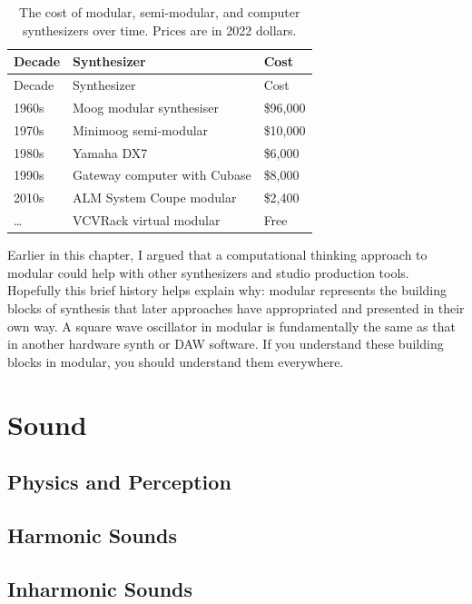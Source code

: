 \documentclass[
]{book}
\begin{document}
\begin{longtable}[]{@{}lll@{}}
\caption{\label{tab:price} The cost of modular, semi-modular, and computer synthesizers over time. Prices are in 2022 dollars.}\tabularnewline
\toprule()
Decade & Synthesizer & Cost \\
\midrule()
\endfirsthead
\toprule()
Decade & Synthesizer & Cost \\
\midrule()
\endhead
1960s & Moog modular synthesiser & \$96,000 \\
1970s & Minimoog semi-modular & \$10,000 \\
1980s & Yamaha DX7 & \$6,000 \\
1990s & Gateway computer with Cubase & \$8,000 \\
2010s & ALM System Coupe modular & \$2,400 \\
\ldots{} & VCVRack virtual modular & Free \\
\bottomrule()
\end{longtable}

Earlier in this chapter, I argued that a computational thinking approach to modular could help with other synthesizers and studio production tools.
Hopefully this brief history helps explain why: modular represents the building blocks of synthesis that later approaches have appropriated and presented in their own way.
A square wave oscillator in modular is fundamentally the same as that in another hardware synth or DAW software.
If you understand these building blocks in modular, you should understand them everywhere.

\hypertarget{part-sound}{%
\part{Sound}\label{part-sound}}

\hypertarget{physics-and-perception}{%
\chapter{Physics and Perception}\label{physics-and-perception}}

\hypertarget{harmonic-sounds}{%
\chapter{Harmonic Sounds}\label{harmonic-sounds}}

\hypertarget{inharmonic-sounds}{%
\chapter{Inharmonic Sounds}\label{inharmonic-sounds}}
\end{document}

